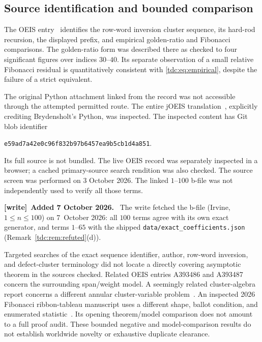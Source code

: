 \documentclass[11pt]{article}
\theoremstyle{definition}\newtheorem{definition}[theorem]{Definition}
\theoremstyle{remark}\newtheorem{remark}[theorem]{Remark}
\newcommand{\file}[1]{\nolinkurl{#1}}
\newenvironment{writenote}[1][]{\par\smallskip\begingroup\small
 \noindent\textbf{[write]}\if\relax\detokenize{#1}\relax\else~\textbf{#1.}\fi\ }%
 {\par\endgroup\smallskip}
\begin{document}
\subsection{Source identification and bounded comparison}
\label{tdc:sec:sources}
The OEIS entry~\cite{oeis} identifies the row-word inversion cluster sequence, its hard-rod recursion, the displayed prefix, and empirical golden-ratio and Fibonacci comparisons. The golden-ratio form was described there as checked to four significant figures over indices $30$--$40$. Its separate observation of a small relative Fibonacci residual is quantitatively consistent with \eqref{tdc:eq:empirical}, despite the failure of a strict equivalent.

The original Python attachment linked from the record was not accessible through the attempted permitted route. The entire jOEIS translation~\cite{joeis}, explicitly crediting Brydensholt's Python, was inspected. The inspected content has Git blob identifier
\begin{center}\texttt{e59ad7a42e0c96f832b97b6457ea9b5cb1d4a851}.
\end{center}
Its full source is not bundled. The live OEIS record was separately inspected in a browser; a cached primary-source search rendition was also checked. The source screen was performed on 3 October 2026. The linked $1$--$100$ b-file was not independently used to verify all those terms.

\begin{writenote}[Added 7 October 2026]
The write fetched the b-file (Irvine, $1\le n\le100$) on 7~October 2026: all
$100$ terms agree with its own exact generator, and terms $1$--$65$ with the
shipped \file{data/exact_coefficients.json}
(Remark~\ref{tdc:rem:refuted}(d)).
\end{writenote}

Targeted searches of the exact sequence identifier, author, row-word inversion, and defect-cluster terminology did not locate a directly covering asymptotic theorem in the sources checked. Related OEIS entries A393486 and A393487 concern the surrounding span/weight model. A seemingly related cluster-algebra report concerns a different annular cluster-variable problem~\cite{clustercomparison}. An inspected 2026 Fibonacci ribbon-tableau manuscript uses a different shape, ballot condition, and enumerated statistic~\cite{ribboncomparison}. Its opening theorem/model comparison does not amount to a full proof audit. These bounded negative and model-comparison results do not establish worldwide novelty or exhaustive duplicate clearance.
\end{document}
